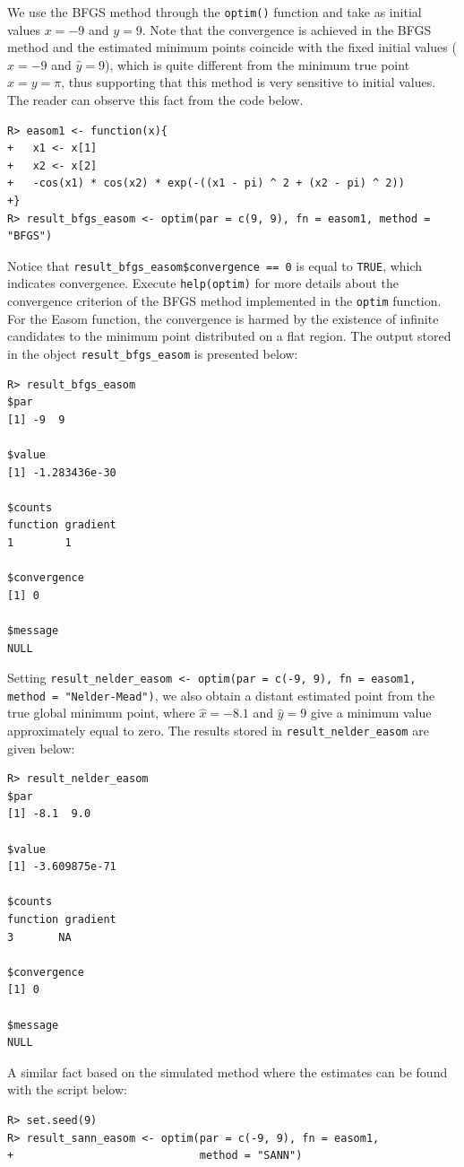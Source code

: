 \documentclass[10pt,letterpaper]{article}
\begin{document}
We use the BFGS method through the \texttt{optim()} function and take as initial values $x=-9$ and $y=9$. Note that the convergence is achieved in the BFGS method and the estimated minimum points coincide with the fixed initial values  ($\hat{x}=-9$ and $\hat{y}=9$), which is quite different from the minimum true point $x=y=\pi$, thus supporting that this method is very sensitive to initial values. The reader can observe this fact from the code below.
\begin{verbatim}
R> easom1 <- function(x){
+   x1 <- x[1]
+   x2 <- x[2]
+   -cos(x1) * cos(x2) * exp(-((x1 - pi) ^ 2 + (x2 - pi) ^ 2))
+}
R> result_bfgs_easom <- optim(par = c(9, 9), fn = easom1, method = "BFGS")
\end{verbatim}
Notice that \texttt{result\_bfgs\_easom\$convergence == 0} is equal to \texttt{TRUE}, which indicates convergence. Exe\-cute \texttt{help(optim)} for more details about the convergence criterion of the BFGS method implemented in the \texttt{optim} function. For the Easom function, the convergence is harmed by the existence of infinite candidates to the minimum point distributed on a flat region. The output stored in the object  \texttt{result\_bfgs\_easom} is presented below:
\begin{verbatim}
R> result_bfgs_easom
$par
[1] -9  9
		
$value
[1] -1.283436e-30
		
$counts
function gradient
1        1
		
$convergence
[1] 0
		
$message
NULL
\end{verbatim}
Setting \texttt{result\_nelder\_easom <- optim(par = c(-9, 9), fn = easom1, method = \newline"Nelder-Mead")}, we also obtain a distant estimated point from the true global minimum point, where $\hat{x}=-8.1$ and $\hat{y}=9$ give a minimum value approximately equal to zero. The results stored in \texttt{result\_nelder\_easom} are given below:
\begin{verbatim}
R> result_nelder_easom
$par
[1] -8.1  9.0

$value
[1] -3.609875e-71

$counts
function gradient
3       NA

$convergence
[1] 0

$message
NULL
\end{verbatim}
A similar fact based on the simulated method where the estimates can be found with the script below:
\begin{verbatim}
R> set.seed(9)
R> result_sann_easom <- optim(par = c(-9, 9), fn = easom1,
+                             method = "SANN")
\end{verbatim}
\end{document}
